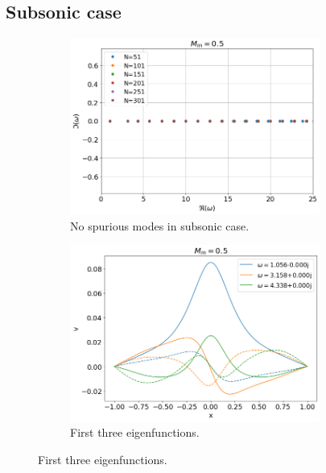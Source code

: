 \documentclass{article}
\begin{document}
    \subsection*{Subsonic case}
    \begin{figure}[H]
        \begin{subfigure}[b]{0.5\textwidth}
            \includegraphics*[width=0.9\textwidth]{img/eigvals-Mm=0.5.png}
            \caption{No spurious modes in subsonic case.}
        \end{subfigure}%
        \begin{subfigure}[b]{0.5\textwidth}
            \includegraphics*[width=0.9\textwidth]{img/eigfuncs-Mm=0.5.png}
            \caption{First three eigenfunctions.}
        \end{subfigure}
    \end{figure}
\end{document}
